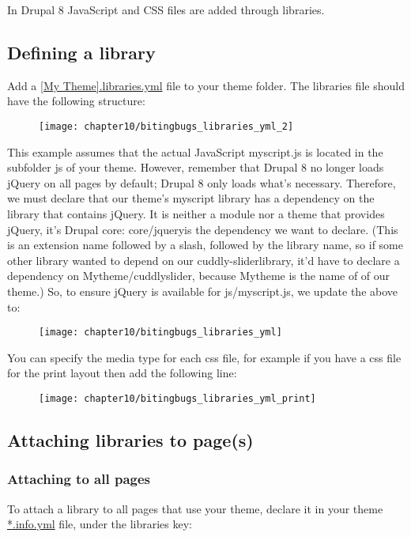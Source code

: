 In Drupal 8 JavaScript and CSS files are added through libraries.

\subsection{Defining a library}

Add a \url{[My Theme].libraries.yml} file to your theme folder. The libraries file should have the following structure:

\begin{figure}[H]
	\centering
	\texttt{[image: chapter10/bitingbugs\_libraries\_yml\_2]}
	\label{fig:bitingbugs_libraries_yml_2}
\end{figure}

This example assumes that the actual JavaScript myscript.js is located in the subfolder js of your theme.
However, remember that Drupal 8 no longer loads jQuery on all pages by default; Drupal 8 only loads what's necessary. Therefore, we must declare that our theme's myscript library has a dependency on the library that contains jQuery. It is neither a module nor a theme that provides jQuery, it's Drupal core: core/jqueryis the dependency we want to declare. (This is an extension name followed by a slash, followed by the library name, so if some other library wanted to depend on our cuddly-­sliderlibrary, it'd have to declare a dependency on Mytheme/cuddly­slider, because Mytheme is the name of of our theme.) So, to ensure jQuery is available for js/myscript.js, we update the above to:

\begin{figure}[H]
	\centering
	\texttt{[image: chapter10/bitingbugs\_libraries\_yml]}
	\label{fig:bitingbugs_libraries_yml}
\end{figure}

You can specify the media type for each css file, for example if you have a css file for the print layout then add the following line:

\begin{figure}[H]
	\centering
	\texttt{[image: chapter10/bitingbugs\_libraries\_yml\_print]}
	\label{fig:bitingbugs_libraries_yml_print}
\end{figure}


\subsection{Attaching libraries to page(s)}

\subsubsection{Attaching to all pages}
To attach a library to all pages that use your theme, declare it in your theme \url{*.info.yml} file, under the libraries key:


